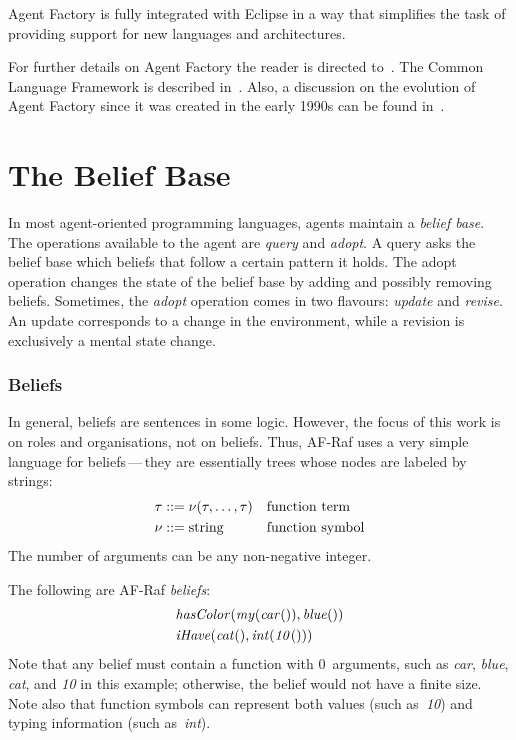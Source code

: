 \documentclass[a4paper,12pt,oneside,fleqn]{book} %
\begin{document}
Agent Factory is fully integrated with Eclipse in a way that simplifies
the task of providing support for new languages and architectures.

For further details on Agent Factory the reader is directed
to~\cite{collier2009modeling}. The Common Language Framework is described
in~\cite{russell2011af}. Also, a discussion on the evolution of Agent Factory since it
was created in the early 1990s can be found in~\cite{muldoon2009towards}.


\section{The Belief Base} %

In most agent-oriented programming languages, agents maintain a
\emph{belief base}.  The operations available to the agent are
\textit{query} and \textit{adopt}.  A query asks the belief base which
beliefs that follow a certain pattern it holds.  The adopt operation
changes the state of the belief base by adding and possibly removing
beliefs.  Sometimes, the {\it adopt\/} operation comes in two flavours:
{\it update\/} and {\it revise}.  An update corresponds to a change in the
environment, while a revision is exclusively a mental state change.

\subsubsection{Beliefs}

In general, beliefs are sentences in some logic.  However, the focus of
this work is on roles and organisations, not on beliefs.  Thus, AF-Raf uses
a very simple language for beliefs\,---\,they are essentially trees whose
nodes are labeled by strings: \begin{align} \tau &::= \nu(\tau,\ldots,\tau)
&& \text{function term} \\ \nu  &::= {\rm string} &&\text{function symbol}
\end{align} The number of arguments can be any non-negative integer.

\begin{example}
The following are AF-Raf \emph{beliefs}:
\begin{align}
&{\it hasColor}({\it my}({\it car}()), {\it blue}()) \\
&{\it iHave}({\it cat}(), {\it int}({\it 10}()))
\end{align}
Note that any belief must contain a function with $0$~arguments, such as
{\it car}, {\it blue}, {\it cat}, and {\it 10\/} in this example;
otherwise, the belief would not have a finite size.  Note also that
function symbols can represent both values (such as~{\it 10\/}) and typing
information (such as~{\it int\/}).
\end{example}
\end{document}
